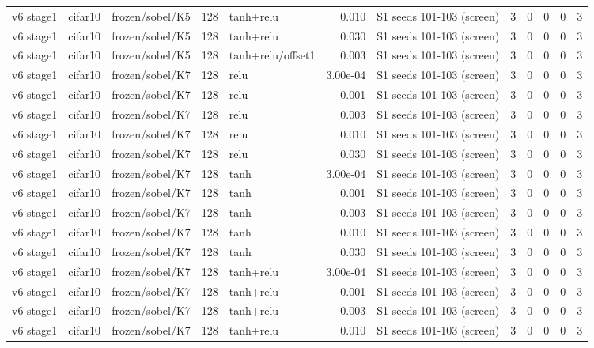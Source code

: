 \begin{table}[htbp]
{\begin{tabular}{@{}lllrlrlrrrrr@{}}
v6 stage1 & cifar10 & frozen/sobel/K5 & 128 & tanh+relu & 0.010 & S1 seeds 101-103 (screen) & 3 & 0 & 0 & 0 & 3 \\
v6 stage1 & cifar10 & frozen/sobel/K5 & 128 & tanh+relu & 0.030 & S1 seeds 101-103 (screen) & 3 & 0 & 0 & 0 & 3 \\
v6 stage1 & cifar10 & frozen/sobel/K5 & 128 & tanh+relu/offset1 & 0.003 & S1 seeds 101-103 (screen) & 3 & 0 & 0 & 0 & 3 \\
v6 stage1 & cifar10 & frozen/sobel/K7 & 128 & relu & 3.00e-04 & S1 seeds 101-103 (screen) & 3 & 0 & 0 & 0 & 3 \\
v6 stage1 & cifar10 & frozen/sobel/K7 & 128 & relu & 0.001 & S1 seeds 101-103 (screen) & 3 & 0 & 0 & 0 & 3 \\
v6 stage1 & cifar10 & frozen/sobel/K7 & 128 & relu & 0.003 & S1 seeds 101-103 (screen) & 3 & 0 & 0 & 0 & 3 \\
v6 stage1 & cifar10 & frozen/sobel/K7 & 128 & relu & 0.010 & S1 seeds 101-103 (screen) & 3 & 0 & 0 & 0 & 3 \\
v6 stage1 & cifar10 & frozen/sobel/K7 & 128 & relu & 0.030 & S1 seeds 101-103 (screen) & 3 & 0 & 0 & 0 & 3 \\
v6 stage1 & cifar10 & frozen/sobel/K7 & 128 & tanh & 3.00e-04 & S1 seeds 101-103 (screen) & 3 & 0 & 0 & 0 & 3 \\
v6 stage1 & cifar10 & frozen/sobel/K7 & 128 & tanh & 0.001 & S1 seeds 101-103 (screen) & 3 & 0 & 0 & 0 & 3 \\
v6 stage1 & cifar10 & frozen/sobel/K7 & 128 & tanh & 0.003 & S1 seeds 101-103 (screen) & 3 & 0 & 0 & 0 & 3 \\
v6 stage1 & cifar10 & frozen/sobel/K7 & 128 & tanh & 0.010 & S1 seeds 101-103 (screen) & 3 & 0 & 0 & 0 & 3 \\
v6 stage1 & cifar10 & frozen/sobel/K7 & 128 & tanh & 0.030 & S1 seeds 101-103 (screen) & 3 & 0 & 0 & 0 & 3 \\
v6 stage1 & cifar10 & frozen/sobel/K7 & 128 & tanh+relu & 3.00e-04 & S1 seeds 101-103 (screen) & 3 & 0 & 0 & 0 & 3 \\
v6 stage1 & cifar10 & frozen/sobel/K7 & 128 & tanh+relu & 0.001 & S1 seeds 101-103 (screen) & 3 & 0 & 0 & 0 & 3 \\
v6 stage1 & cifar10 & frozen/sobel/K7 & 128 & tanh+relu & 0.003 & S1 seeds 101-103 (screen) & 3 & 0 & 0 & 0 & 3 \\
v6 stage1 & cifar10 & frozen/sobel/K7 & 128 & tanh+relu & 0.010 & S1 seeds 101-103 (screen) & 3 & 0 & 0 & 0 & 3 \\

\end{tabular}}
\end{table}
